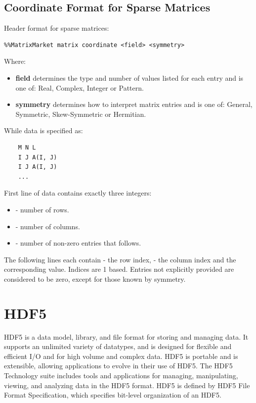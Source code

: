 \documentclass[thesis=M,english]{FITthesis}[2019/12/23]
\begin{document}
\subsection{Coordinate Format for Sparse Matrices}

Header format for sparse matrices:
\begin{lstlisting}
%%MatrixMarket matrix coordinate <field> <symmetry>
\end{lstlisting}

Where:
\begin{itemize}
    \item \textbf{field} determines the type and number of values listed for each entry
          and is one of: Real, Complex, Integer or Pattern.
    \item \textbf{symmetry} determines how to interpret matrix entries
          and is one of: General, Symmetric, Skew-Symmetric or Hermitian.
\end{itemize}

While data is specified as:
\begin{lstlisting}
    M N L
    I J A(I, J)
    I J A(I, J)
    ...
\end{lstlisting}

First line of data contains exactly three integers:
\begin{itemize}
    \item {} - number of rows.
    \item {} - number of columns.
    \item {} - number of non-zero entries that follows.
\end{itemize}

The following  lines each contain  - the row index,  - the column index
and the corresponding value. Indices are 1 based. Entries not explicitly provided are considered
to be zero, except for those known by symmetry.


\section{HDF5}\label{theory:HDF5}

HDF5 is a data model, library, and file format for storing and managing data.
It supports an unlimited variety of datatypes, and is designed for flexible and
efficient I/O and for high volume and complex data. HDF5 is portable and is extensible,
allowing applications to evolve in their use of HDF5. The HDF5 Technology suite includes
tools and applications for managing, manipulating, viewing, and analyzing data in the HDF5 format.
\cite{hdf5} HDF5 is defined by HDF5 File Format Specification, which specifies bit-level organization of an HDF5.
\end{document}
